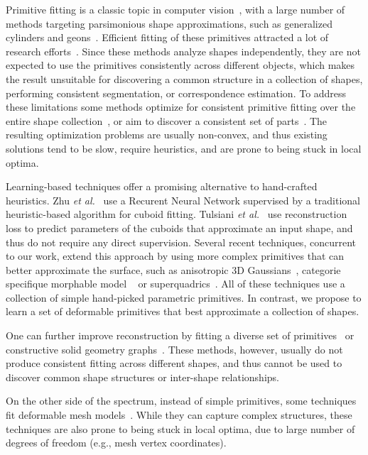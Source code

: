\documentclass{article}
\newcommand{\etal}{\textit{et al.}}
\begin{document}
Primitive fitting is a classic topic in computer vision~\cite{roberts1963machine}, with a large number of methods targeting parsimonious shape approximations, such as generalized cylinders\cite{binford1971visual} and geons~\cite{biederman1987recognition}. Efficient fitting of these primitives attracted a lot of research efforts~\cite{kaiser2018survey,li_globFit_sigg11,schnabel-2009-completion,schnabel2007efficient}.
Since these methods analyze shapes independently, they are not expected to use the primitives consistently across different objects, which makes the result unsuitable for discovering a common structure in a collection of shapes, performing consistent segmentation, or correspondence estimation.
To address these limitations some methods optimize for consistent primitive fitting over the entire shape collection~\cite{Kim13}, or aim to discover a consistent set of parts~\cite{Golovinskiy09,Huang11,Sidi2011}. The resulting
optimization problems are usually non-convex, and thus existing solutions tend to be slow, require heuristics, and are prone to being stuck in local optima.



Learning-based techniques offer a promising alternative to hand-crafted heuristics. Zhu \etal ~\cite{zou20173d} use a Recurent Neural Network supervised by a traditional heuristic-based algorithm for cuboid fitting. Tulsiani \etal~\cite{abstractionTulsiani17} use reconstruction loss to predict parameters of the cuboids that approximate an input shape, and thus do not require any direct supervision.
Several recent techniques, concurrent to our work, extend this approach by using more complex primitives that can better approximate the surface, such as anisotropic 3D Gaussians~\cite{genova2019learning}, categorie specifique morphable model ~\cite{cmrKanazawa18}  or superquadrics~\cite{Paschalidou2019CVPR}.
All of these techniques use a collection of simple hand-picked parametric primitives. In contrast, we propose to learn a set of deformable primitives that best approximate a collection of shapes.

One can further improve reconstruction by fitting a diverse set of primitives~\cite{li2018supervised} or  constructive solid geometry graphs~\cite{sharma2018csgnet}. These methods, however, usually do not produce consistent fitting across different shapes, and thus cannot be used to discover common shape structures or inter-shape relationships.


On the other side of the spectrum, instead of simple primitives, some techniques fit deformable mesh models~\cite{ Allen02, Allen03, Loper15,Zuffi15}. While they can capture complex structures, these techniques are also prone to being stuck in local optima, due to large number of degrees of freedom (e.g., mesh vertex coordinates).
\end{document}
